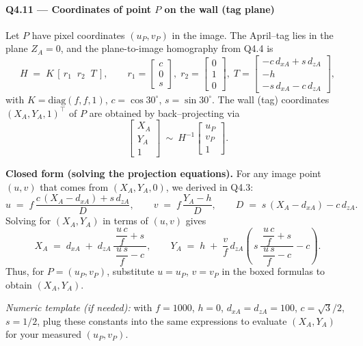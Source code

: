\documentclass[12pt]{article}
\begin{document}
\paragraph{Q4.11 — Coordinates of point \(P\) on the wall (tag plane)}
Let \(P\) have pixel coordinates \((u_P,v_P)\) in the image. The April–tag lies in the plane \(Z_A=0\),
and the plane-to-image homography from Q4.4 is
\[
H \;=\; K\,[\,r_1\;\; r_2\;\; T\,],\qquad
r_1=\begin{bmatrix}c\\0\\s\end{bmatrix},\;
r_2=\begin{bmatrix}0\\1\\0\end{bmatrix},\;
T=\begin{bmatrix}-c\,d_{xA}+s\,d_{zA}\\ -h\\ -s\,d_{xA}-c\,d_{zA}\end{bmatrix},
\]
with \(K=\mathrm{diag}(f,f,1)\), \(c=\cos 30^\circ\), \(s=\sin 30^\circ\).
The wall (tag) coordinates \((X_A,Y_A,1)^\top\) of \(P\) are obtained by back–projecting via
\[
\begin{bmatrix}X_A\\[2pt] Y_A\\[2pt] 1\end{bmatrix}
~\sim~
H^{-1}\begin{bmatrix}u_P\\[2pt] v_P\\[2pt] 1\end{bmatrix}.
\]

\medskip
\textbf{Closed form (solving the projection equations).}
For any image point \((u,v)\) that comes from \((X_A,Y_A,0)\), we derived in Q4.3:
\[
u \;=\; f\,\frac{c\,(X_A-d_{xA}) + s\,d_{zA}}{\,D\,},\qquad
v \;=\; f\,\frac{Y_A - h}{\,D\,},\qquad
D \;=\; s\,(X_A-d_{xA}) - c\,d_{zA}.
\]
Solving for \((X_A,Y_A)\) in terms of \((u,v)\) gives
\[
\boxed{\;
X_A \;=\; d_{xA} \;+\; d_{zA}\,\frac{\ \dfrac{u\,c}{f} + s\ }{\ \dfrac{u\,s}{f} - c\ },\qquad
Y_A \;=\; h \;+\; \frac{v}{f}\,d_{zA}\!\left(\, s\,\frac{\ \dfrac{u\,c}{f} + s\ }{\ \dfrac{u\,s}{f} - c\ } - c \right).
\;}
\]
Thus, for \(P=(u_P,v_P)\), substitute \(u\!=\!u_P\), \(v\!=\!v_P\) in the boxed formulas to obtain \((X_A,Y_A)\).

\medskip
\textit{Numeric template (if needed):} with \(f=1000\), \(h=0\), \(d_{xA}=d_{zA}=100\),
\(c=\sqrt{3}/2\), \(s=1/2\), plug these constants into the same expressions to evaluate \((X_A,Y_A)\) for your measured \((u_P,v_P)\).
\end{document}
